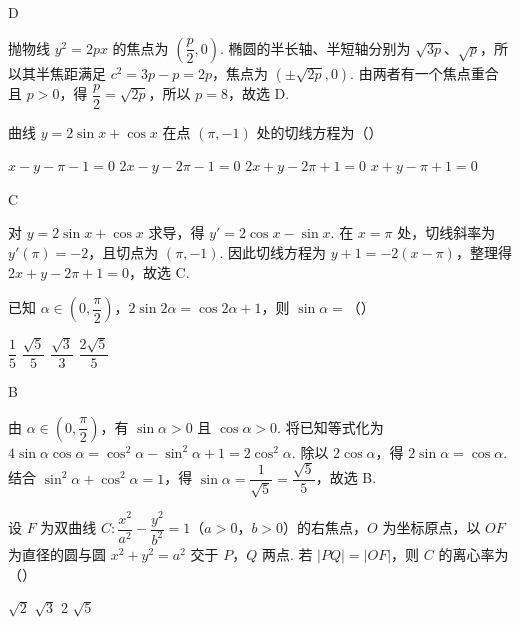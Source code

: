 \begin{answer}
D
\end{answer}

\begin{solution}
抛物线 \(y^2=2px\) 的焦点为 \(\left(\dfrac p2,0\right)\). 椭圆的半长轴、半短轴分别为 \(\sqrt{3p}\)、\(\sqrt p\)，所以其半焦距满足 \(c^2=3p-p=2p\)，焦点为 \(\left(\pm\sqrt{2p},0\right)\). 由两者有一个焦点重合且 \(p>0\)，得 \(\dfrac p2=\sqrt{2p}\)，所以 \(p=8\)，故选 D.
\end{solution}

\begin{problem}
曲线 \(y=2\sin x+\cos x\) 在点 \((\pi,-1)\) 处的切线方程为（\quad）

\choices
    {\(x-y-\pi-1=0\)}
    {\(2x-y-2\pi-1=0\)}
    {\(2x+y-2\pi+1=0\)}
    {\(x+y-\pi+1=0\)}
\end{problem}

\begin{answer}
C
\end{answer}

\begin{solution}
对 \(y=2\sin x+\cos x\) 求导，得 \(y'=2\cos x-\sin x\). 在 \(x=\pi\) 处，切线斜率为 \(y'(\pi)=-2\)，且切点为 \((\pi,-1)\). 因此切线方程为 \(y+1=-2(x-\pi)\)，整理得 \(2x+y-2\pi+1=0\)，故选 C.
\end{solution}

\begin{problem}
已知 \(\alpha\in\left(0,\dfrac{\pi}{2}\right)\)，\(2\sin2\alpha=\cos2\alpha+1\)，则 \(\sin\alpha=\)（\quad）

\choices
    {\(\dfrac15\)}
    {\(\dfrac{\sqrt5}{5}\)}
    {\(\dfrac{\sqrt3}{3}\)}
    {\(\dfrac{2\sqrt5}{5}\)}
\end{problem}

\begin{answer}
B
\end{answer}

\begin{solution}
由 \(\alpha\in\left(0,\dfrac{\pi}{2}\right)\)，有 \(\sin\alpha>0\) 且 \(\cos\alpha>0\). 将已知等式化为 \(4\sin\alpha\cos\alpha=\cos^2\alpha-\sin^2\alpha+1=2\cos^2\alpha\). 除以 \(2\cos\alpha\)，得 \(2\sin\alpha=\cos\alpha\). 结合 \(\sin^2\alpha+\cos^2\alpha=1\)，得 \(\sin\alpha=\dfrac1{\sqrt5}=\dfrac{\sqrt5}{5}\)，故选 B.
\end{solution}

\begin{problem}
设 \(F\) 为双曲线 \(C:\dfrac{x^2}{a^2}-\dfrac{y^2}{b^2}=1\)（\(a>0\)，\(b>0\)）的右焦点，\(O\) 为坐标原点，以 \(OF\) 为直径的圆与圆 \(x^2+y^2=a^2\) 交于 \(P\)，\(Q\) 两点. 若 \(|PQ|=|OF|\)，则 \(C\) 的离心率为（\quad）

\choices
    {\(\sqrt2\)}
    {\(\sqrt3\)}
    {\(2\)}
    {\(\sqrt5\)}
\end{problem}

